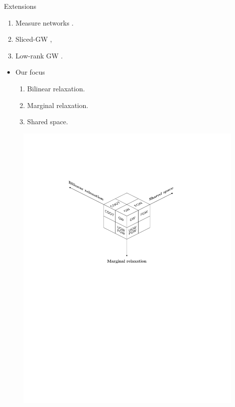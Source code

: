 \documentclass{beamer}
\begin{document}
\begin{frame}{Extensions}
  \tiny
  \begin{enumerate}
    \item Measure networks \parencite{Chowdhury19}.
    \item Sliced-GW \parencite{Vayer19a},
    \item Low-rank GW \parencite{Meyer21b}.
  \end{enumerate}
  \begin{minipage}[t]{0.5\linewidth}
    \begin{itemize}
      \item Our focus
      \begin{enumerate}
        \item Bilinear relaxation.
        \item Marginal relaxation.
        \item Shared space.
      \end{enumerate}
    \end{itemize}
    \end{minipage}%
    \hfill%
    \hspace{-6cm}
    \begin{minipage}[t]{0.8\linewidth}
      \vspace{-2cm}
    \begin{figure}
      \centering
      \includegraphics[width=1.2\linewidth, keepaspectratio=true]{OT_new/cube_extension.pdf}
    \end{figure}
    \end{minipage}
\end{frame}
\end{document}
